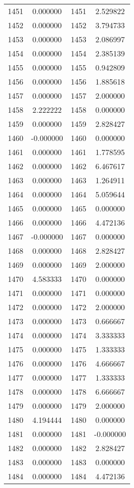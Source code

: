 \documentclass[12pt]{article}
\begin{document}
\begin{longtable}{@{}cccc@{}}
1451 & 0.000000 & 1451 & 2.529822 \\
1452 & 0.000000 & 1452 & 3.794733 \\
1453 & 0.000000 & 1453 & 2.086997 \\
1454 & 0.000000 & 1454 & 2.385139 \\
1455 & 0.000000 & 1455 & 0.942809 \\
1456 & 0.000000 & 1456 & 1.885618 \\
1457 & 0.000000 & 1457 & 2.000000 \\
1458 & 2.222222 & 1458 & 0.000000 \\
1459 & 0.000000 & 1459 & 2.828427 \\
1460 & -0.000000 & 1460 & 0.000000 \\
1461 & 0.000000 & 1461 & 1.778595 \\
1462 & 0.000000 & 1462 & 6.467617 \\
1463 & 0.000000 & 1463 & 1.264911 \\
1464 & 0.000000 & 1464 & 5.059644 \\
1465 & 0.000000 & 1465 & 0.000000 \\
1466 & 0.000000 & 1466 & 4.472136 \\
1467 & -0.000000 & 1467 & 0.000000 \\
1468 & 0.000000 & 1468 & 2.828427 \\
1469 & 0.000000 & 1469 & 2.000000 \\
1470 & 4.583333 & 1470 & 0.000000 \\
1471 & 0.000000 & 1471 & 0.000000 \\
1472 & 0.000000 & 1472 & 2.000000 \\
1473 & 0.000000 & 1473 & 0.666667 \\
1474 & 0.000000 & 1474 & 3.333333 \\
1475 & 0.000000 & 1475 & 1.333333 \\
1476 & 0.000000 & 1476 & 4.666667 \\
1477 & 0.000000 & 1477 & 1.333333 \\
1478 & 0.000000 & 1478 & 6.666667 \\
1479 & 0.000000 & 1479 & 2.000000 \\
1480 & 4.194444 & 1480 & 0.000000 \\
1481 & 0.000000 & 1481 & -0.000000 \\
1482 & 0.000000 & 1482 & 2.828427 \\
1483 & 0.000000 & 1483 & 0.000000 \\
1484 & 0.000000 & 1484 & 4.472136 \\

\end{longtable}
\end{document}
